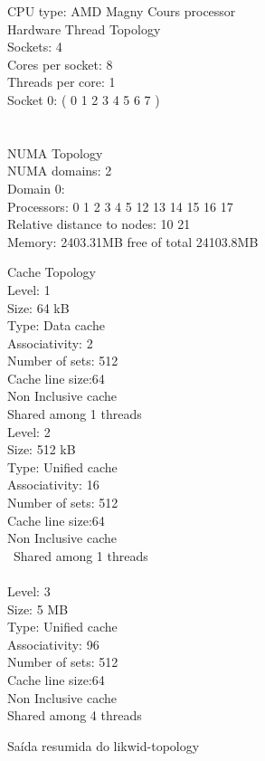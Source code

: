 \documentclass[12pt]{article}
\begin{document}
\begin{figure}[ht]\footnotesize
\begin{tt}
\begin{multicols}{2}
CPU type:	AMD Magny Cours processor\\
Hardware Thread Topology\\
Sockets:	4\\
Cores per socket:	8\\
Threads per core:	1\\
Socket 0: ( 0 1 2 3 4 5 6 7 )\\
\\
\\
NUMA Topology\\
NUMA domains: 2\\
Domain 0:\\
Processors: 0 1 2 3 4 5 12 13 14 15 16 17\\
Relative distance to nodes: 10 21\\
Memory: 2403.31MB free of total 24103.8MB\\
\end{multicols}
\begin{multicols}{3}
Cache Topology\\
Level:	1\\
Size:	64 kB\\
Type:	Data cache\\
Associativity:	2\\
Number of sets:	512\\
Cache line size:64\\
Non Inclusive cache\\
Shared among 1 threads\\
Level:	2\\
Size:	512 kB\\
Type:	Unified cache\\
Associativity:	16\\
Number of sets:	512\\
Cache line size:64\\
Non Inclusive cache\\\
Shared among 1 threads\\
\\
Level:	3\\
Size:	5 MB\\
Type:	Unified cache\\
Associativity:	96\\
Number of sets:	512\\
Cache line size:64\\
Non Inclusive cache\\
Shared among 4 threads\\
\end{multicols}
\end{tt}\caption{Saída resumida do likwid-topology}\label{fig:topologyOut}
\end{figure}
\end{document}
